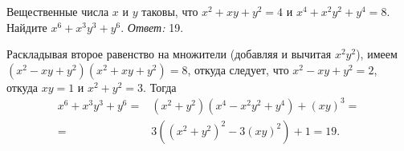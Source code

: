 \problem
Вещественные числа $x$ и $y$ таковы, что
$x^2 + x y + y^2 = 4$ и $x^4 + x^2 y^2 + y^4 = 8$.
Найдите $x^6 + x^3 y^3 + y^6$.
\solution
\emph{Ответ:} 19.
\par
Раскладывая второе равенство на множители (добавляя и вычитая $x^2 y^2$), имеем
$(x^2 - x y + y^2) (x^2 + x y + y^2) = 8$,
откуда следует, что $x^2  - x y + y^2 = 2$,
откуда $x y = 1$ и $x^2 + y^2 = 3$.
Тогда
\begin{align*}
    x^6 + x^3 y^3 + y^6
={}&
    (x^2 + y^2) (x^4 - x^2 y^2 + y^4) + (x y)^3
=\\={}&
    3((x^2 + y^2)^2 - 3 (x y)^2) + 1 = 19
.\end{align*}
\endproblem
